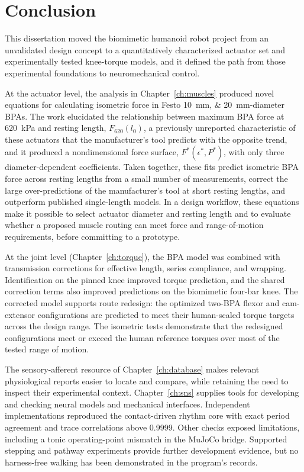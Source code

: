 \chapter{Conclusion}\label{ch:conclusion}
\graphicspath{{../Figures/80-conclusion/}{figs/80-conclusion/}}

This dissertation moved the biomimetic humanoid robot project from an unvalidated design concept to a quantitatively characterized actuator set and experimentally tested knee-torque models, and it defined the path from those experimental foundations to neuromechanical control.

At the actuator level, the analysis in Chapter~\ref{ch:muscles} produced novel equations for calculating isometric force in Festo \qtylist{10;20}{\mm}-diameter BPAs. The work elucidated the relationship between maximum BPA force at \qty{620}{\kPa} and resting length, $F_{620}(l_0)$, a previously unreported characteristic of these actuators that the manufacturer's tool predicts with the opposite trend, and it produced a nondimensional force surface, $F^*(\epsilon^*,P^*)$, with only three diameter-dependent coefficients. Taken together, these fits predict isometric BPA force across resting lengths from a small number of measurements, correct the large over-predictions of the manufacturer's tool at short resting lengths, and outperform published single-length models. In a design workflow, these equations make it possible to select actuator diameter and resting length and to evaluate whether a proposed muscle routing can meet force and range-of-motion requirements, before committing to a prototype.

At the joint level (Chapter~\ref{ch:torque}), the BPA model was combined with transmission corrections for effective length, series compliance, and wrapping. Identification on the pinned knee improved torque prediction, and the shared correction terms also improved predictions on the biomimetic four-bar knee. The corrected model supports route redesign: the optimized two-BPA flexor and cam-extensor configurations are predicted to meet their human-scaled torque targets across the design range. The isometric tests demonstrate that the redesigned configurations meet or exceed the human reference torques over most of the tested range of motion.

The sensory-afferent resource of Chapter~\ref{ch:database} makes relevant physiological reports easier to locate and compare, while retaining the need to inspect their experimental context. Chapter~\ref{ch:sns} supplies tools for developing and checking neural models and mechanical interfaces. Independent implementations reproduced the contact-driven rhythm core with exact period agreement and trace correlations above 0.9999. Other checks exposed limitations, including a tonic operating-point mismatch in the MuJoCo bridge. Supported stepping and pathway experiments provide further development evidence, but no harness-free walking has been demonstrated in the program's records.

